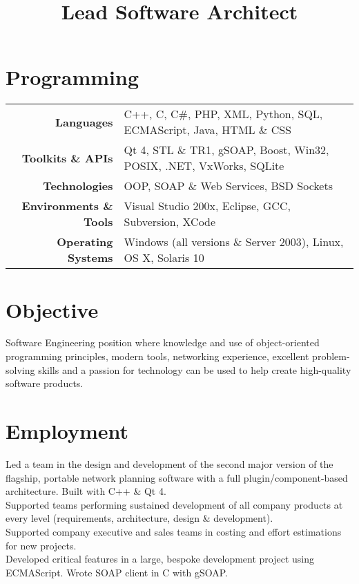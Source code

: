 \documentclass{resume}
\begin{document}
\address{22 Morse Close\\Chippenham\\SN15 3FY\\UK}
\address{lee@leegent.net\\+44 7748 183797}

\begin{resume}

\section{Programming} 
\begin{tabular}{rl}
\textbf{Languages} & C++, C, C\#, PHP, XML, Python, SQL, ECMAScript, Java, HTML \& CSS \\
\textbf{Toolkits \& APIs} & Qt 4, STL \& TR1, gSOAP, Boost, Win32, POSIX, .NET, VxWorks, SQLite \\
\textbf{Technologies} & OOP, SOAP \& Web Services, BSD Sockets \\
\textbf{Environments \& Tools} & Visual Studio 200x, Eclipse, GCC, Subversion, XCode \\
\textbf{Operating Systems} & Windows (all versions \& Server 2003), Linux, OS X, Solaris 10
\end{tabular}

\section{Objective}
Software Engineering position where knowledge and use of object-oriented programming principles, modern tools, networking experience, excellent problem-solving skills and a passion for technology can be used to help create high-quality software products.

\section{Employment}

\title{\bf{Lead Software Architect}}
\begin{position}
Led a team in the design and development of the second major version of the flagship, portable network planning software with a full plugin/component-based architecture.  Built with C++ \& Qt 4.\vspace{1mm}\\
Supported teams performing sustained development of all company products at every level (requirements, architecture, design \& development).\vspace{1mm}\\
Supported company executive and sales teams in costing and effort estimations for new projects.\vspace{1mm}\\
Developed critical features in a large, bespoke development project using ECMAScript.  Wrote SOAP client in C with gSOAP.
\end{position}


\end{resume}
\end{document}
